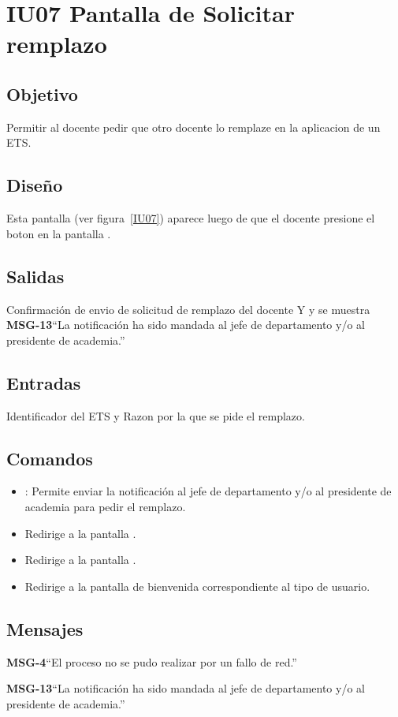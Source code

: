 \section{IU07 Pantalla de Solicitar remplazo}

\subsection{Objetivo}
Permitir al docente pedir que otro docente lo remplaze en la aplicacion de un ETS.

\subsection{Diseño}
Esta pantalla  (ver figura~\ref{IU07}) aparece luego de que el docente presione el boton  en la pantalla .


\subsection{Salidas}
Confirmación de envio de solicitud de remplazo del docente Y y se muestra {\bf MSG-13}{``La notificación ha sido mandada al jefe de departamento y/o al presidente de academia.''}

\subsection{Entradas}
Identificador del ETS y Razon por la que se pide el remplazo.

\subsection{Comandos}
\begin{itemize}
	\item {}: Permite enviar la notificación al jefe de departamento y/o al presidente de academia para pedir el remplazo.
	\item {} Redirige a la pantalla .
    \item {} Redirige a la pantalla .
    \item {} Redirige a la pantalla de bienvenida correspondiente al tipo de usuario.
\end{itemize}

\subsection{Mensajes}

\begin{Citemize}
	\item {\bf MSG-4}{``El proceso no se pudo realizar por un fallo de red.''}
	\item {\bf MSG-13}{``La notificación ha sido mandada al jefe de departamento y/o al presidente de academia.''}
\end{Citemize}

